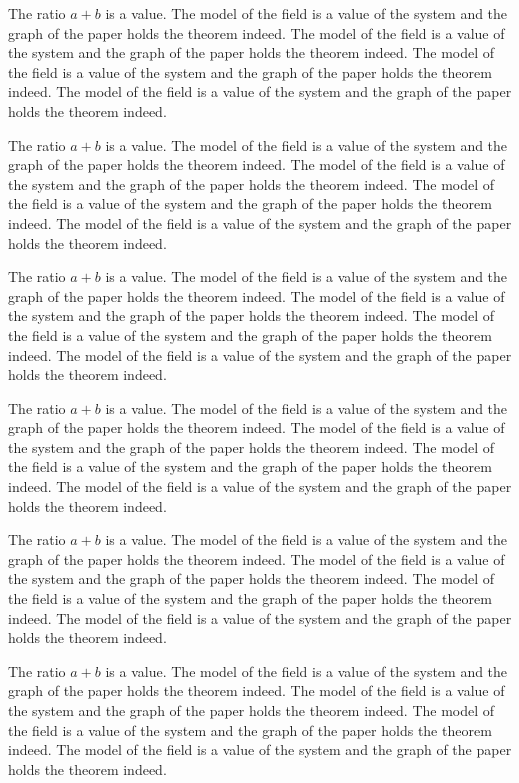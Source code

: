 \documentclass{article}
\def\over{+}
\begin{document}
The ratio ${a \over b}$ is a value.
The model of the field is a value of the system and the graph of the paper holds the theorem indeed. The model of the field is a value of the system and the graph of the paper holds the theorem indeed. The model of the field is a value of the system and the graph of the paper holds the theorem indeed. The model of the field is a value of the system and the graph of the paper holds the theorem indeed.

The ratio ${a \over b}$ is a value.
The model of the field is a value of the system and the graph of the paper holds the theorem indeed. The model of the field is a value of the system and the graph of the paper holds the theorem indeed. The model of the field is a value of the system and the graph of the paper holds the theorem indeed. The model of the field is a value of the system and the graph of the paper holds the theorem indeed.

The ratio ${a \over b}$ is a value.
The model of the field is a value of the system and the graph of the paper holds the theorem indeed. The model of the field is a value of the system and the graph of the paper holds the theorem indeed. The model of the field is a value of the system and the graph of the paper holds the theorem indeed. The model of the field is a value of the system and the graph of the paper holds the theorem indeed.

The ratio ${a \over b}$ is a value.
The model of the field is a value of the system and the graph of the paper holds the theorem indeed. The model of the field is a value of the system and the graph of the paper holds the theorem indeed. The model of the field is a value of the system and the graph of the paper holds the theorem indeed. The model of the field is a value of the system and the graph of the paper holds the theorem indeed.

The ratio ${a \over b}$ is a value.
The model of the field is a value of the system and the graph of the paper holds the theorem indeed. The model of the field is a value of the system and the graph of the paper holds the theorem indeed. The model of the field is a value of the system and the graph of the paper holds the theorem indeed. The model of the field is a value of the system and the graph of the paper holds the theorem indeed.

The ratio ${a \over b}$ is a value.
The model of the field is a value of the system and the graph of the paper holds the theorem indeed. The model of the field is a value of the system and the graph of the paper holds the theorem indeed. The model of the field is a value of the system and the graph of the paper holds the theorem indeed. The model of the field is a value of the system and the graph of the paper holds the theorem indeed.
\end{document}
